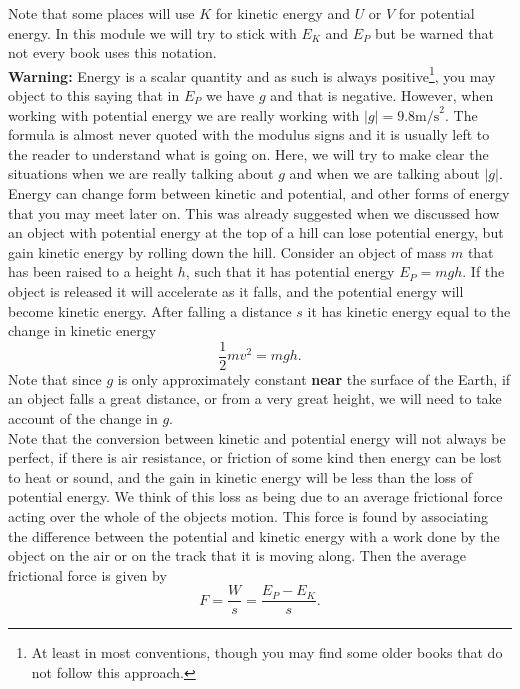 \documentclass[a4paper,12pt]{book}
\begin{document}
Note that some places will use $K$ for   kinetic energy and $U$ or $V$ for potential energy. In this module we will try to stick with $E_{K}$ and $E_{P}$ but be warned that not every book uses this notation.\\

\textbf{Warning:} Energy is a scalar quantity and as such is always positive\footnote{At least in most conventions, though you may find some older books that do not follow this approach.}, you may object to this saying that in $E_{P}$ we have $g$ and that is negative. However, when working with potential energy we are really working with $\vert g\vert =9.8\text{m/s}^{2}$. The formula is almost never quoted with the modulus signs and it is usually left to the reader to understand what is going on. Here, we will try to make clear the situations when we are really talking about $g$ and when we are talking about $\vert g\vert$.\\

Energy can change form between kinetic and potential, and other forms of energy that you may meet later on.  This was already suggested when we discussed how an object with potential energy at the top of a hill can lose potential energy, but gain kinetic energy by rolling down the hill. Consider an object of mass $m$ that has been raised to a height $h$, such that it has potential energy $E_{P}=mgh$. If the object is released it will accelerate as it falls, and the potential energy will become kinetic energy. After falling a distance $s$ it has kinetic energy equal to the change in kinetic energy
\begin{equation*}
\frac{1}{2}mv^{2}=mg h.
\end{equation*}
Note that since $g$ is only approximately constant \textbf{near} the surface of the Earth, if an object falls a great distance, or from a very great height, we will need to take account of the change in $g$.\\

Note that the conversion between kinetic and potential energy will not always be perfect, if there is air resistance, or friction of some kind then energy can be lost to heat or sound, and the gain in kinetic energy will be less than the loss of potential energy. We think of this loss as being due to an average frictional force acting over the whole of the objects motion. This force is found by associating the difference between the potential and kinetic energy with a work done by the object on the air or on the track that it is moving along. Then the average frictional force is given by
\begin{equation*}
F=\frac{W}{s}=\frac{E_{P}-E_{K}}{s}.
\end{equation*}
\end{document}

